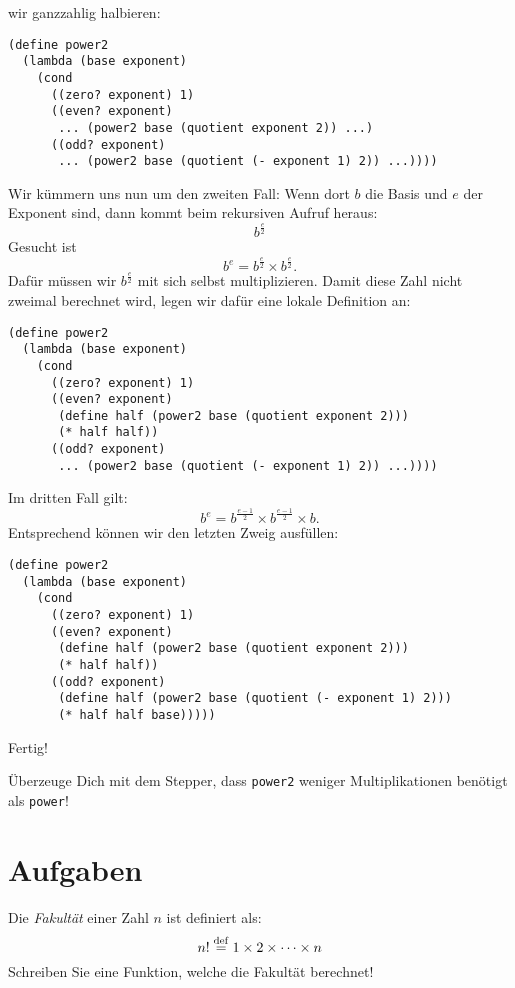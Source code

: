 wir ganzzahlig halbieren:
%
\begin{lstlisting}
(define power2
  (lambda (base exponent)
    (cond
      ((zero? exponent) 1)
      ((even? exponent)
       ... (power2 base (quotient exponent 2)) ...)
      ((odd? exponent)
       ... (power2 base (quotient (- exponent 1) 2)) ...))))
\end{lstlisting}
%
Wir kümmern uns nun um den zweiten Fall: Wenn dort $b$ die Basis und
$e$ der Exponent sind, dann kommt beim rekursiven Aufruf heraus:
%
\begin{displaymath}
  b^{\frac{e}{2}}
\end{displaymath}
%
Gesucht ist \[b^e = b^{\frac{e}{2}} \times b^{\frac{e}{2}}.\]
Dafür müssen wir $b^{\frac{e}{2}}$ mit sich selbst
multiplizieren. Damit diese Zahl
nicht zweimal berechnet wird, legen wir dafür eine lokale Definition an:
%
\begin{lstlisting}
(define power2
  (lambda (base exponent)
    (cond
      ((zero? exponent) 1)
      ((even? exponent)
       (define half (power2 base (quotient exponent 2)))
       (* half half))
      ((odd? exponent)
       ... (power2 base (quotient (- exponent 1) 2)) ...))))
\end{lstlisting}
%
Im dritten Fall gilt:
\begin{displaymath}
  b^e = b^{\frac{e-1}{2}} \times b^{\frac{e-1}{2}} \times b.
\end{displaymath}
%
Entsprechend können wir den letzten Zweig ausfüllen:
%
\begin{lstlisting}
(define power2
  (lambda (base exponent)
    (cond
      ((zero? exponent) 1)
      ((even? exponent)
       (define half (power2 base (quotient exponent 2)))
       (* half half))
      ((odd? exponent)
       (define half (power2 base (quotient (- exponent 1) 2)))
       (* half half base)))))
\end{lstlisting}
%
Fertig!
\begin{aufgabe}
  Überzeuge Dich mit dem Stepper, dass \lstinline{power2} weniger
  Multiplikationen benötigt als \lstinline{power}!
\end{aufgabe}

\section*{Aufgaben}

\begin{aufgabe}
  Die \textit{Fakultät} einer Zahl $n$ ist definiert als:
  \begin{displaymath}
    n! \stackrel{\rm def}{=} 1 \times 2 \times \cdots \times n
  \end{displaymath}
  Schreiben Sie eine Funktion, welche die Fakultät berechnet!
\end{aufgabe}

